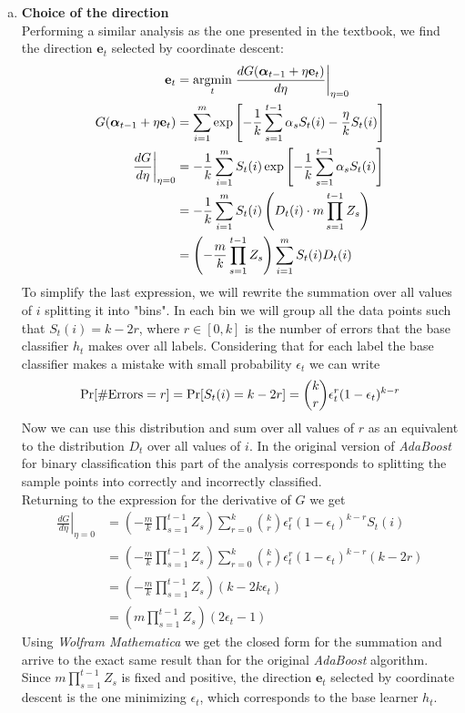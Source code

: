 \documentclass{article}
\DeclareMathOperator*{\argmin}{\rm argmin}
\begin{document}
\begin{enumerate}[(a)]
    \item \textbf{Choice of the direction}\\
    Performing a similar analysis as the one presented in the textbook, we find the direction $\mathbf{e}_t$ selected by coordinate descent:
    \begin{align*}
        \mathbf{e}_t &= \underset{t}{\argmin}\left.\frac{dG(\boldsymbol{\alpha}_{t-1}+\eta \mathbf{e}_t)}{d\eta}\right|_{\eta=0}\\
        G(\boldsymbol{\alpha}_{t-1}+\eta \mathbf{e}_t) &= \sum_{i=1}^m\exp\left[-\frac{1}{k}\sum_{s=1}^{t-1}\alpha_sS_t(i)-\frac{\eta}{k}S_t(i)\right]\\
        \left.\frac{dG}{d\eta}\right|_{\eta=0} &= -\frac{1}{k}\sum_{i=1}^mS_t(i) \exp\left[-\frac{1}{k}\sum_{s=1}^{t-1}\alpha_sS_t(i)\right]\\
        &= -\frac{1}{k}\sum_{i=1}^m S_t(i)\left(D_t(i)\cdot m \prod_{s=1}^{t-1}Z_s\right)\\
        &= \left(-\frac{m}{k} \prod_{s=1}^{t-1}Z_s\right)\sum_{i=1}^m S_t(i)D_t(i)
    \end{align*}
    To simplify the last expression, we will rewrite the summation over all values of $i$ splitting it into "bins". In each bin we will group all the data points such that $S_t(i) = k - 2r$, where $r \in [0,k]$ is the number of errors that the base classifier $h_t$ makes over all labels. Considering that for each label the base classifier makes a mistake with small probability $\epsilon_t$ we can write
    \begin{equation*}
        \textnormal{Pr}[\textnormal{\#Errors} = r] = \textnormal{Pr}[S_t(i) = k - 2r] = \binom{k}{r} \epsilon_t^r (1-\epsilon_t)^{k-r}
    \end{equation*}
    Now we can use this distribution and sum over all values of $r$ as an equivalent to the distribution $D_t$ over all values of $i$. In the original version of \emph{AdaBoost} for binary classification this part of the analysis corresponds to splitting the sample points into correctly and incorrectly classified.\\
    Returning to the expression for the derivative of $G$ we get
    \begin{align*}
        \left.\frac{dG}{d\eta}\right|_{\eta=0} &= \left(-\frac{m}{k} \prod_{s=1}^{t-1}Z_s\right)\sum_{r=0}^k \binom{k}{r} \epsilon_t^r (1-\epsilon_t)^{k-r} S_t(i)\\
        &= \left(-\frac{m}{k} \prod_{s=1}^{t-1}Z_s\right)\sum_{r=0}^k \binom{k}{r} \epsilon_t^r (1-\epsilon_t)^{k-r} (k-2r)\\
        &= \left(-\frac{m}{k} \prod_{s=1}^{t-1}Z_s\right)(k-2k\epsilon_t)\\
        &= \left(m \prod_{s=1}^{t-1}Z_s\right)(2\epsilon_t-1)
    \end{align*}
    Using \emph{Wolfram Mathematica} we get the closed form for the summation and arrive to the exact same result than for the original \emph{AdaBoost} algorithm. Since $m\prod_{s=1}^{t-1}Z_s$ is fixed and positive, the direction $\mathbf{e}_t$ selected by coordinate descent is the one minimizing $\epsilon_t$, which corresponds to the base learner $h_t$.
    

\end{enumerate}
\end{document}
